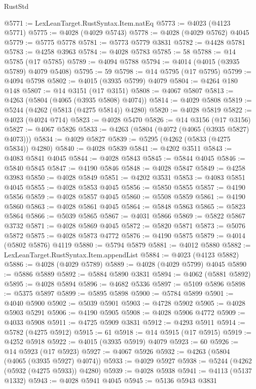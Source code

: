 \begin{lexlean}{RustStd}
\begin{coremodule}
@5771 := LexLeanTarget.RustSyntax.Item.natEq
@5773 := @4023 (@4123 @5771)
@5775 := @4028 (@4029 @5743)
@5778 := @4028 (@4029 @5762) @4045
@5779 := @5775 @5778
@5781 := @5773 @5779 @3831
@5782 := @4428 @5781
@5783 := @4258 @3963
@5784 := @4028 @5783
@5785 := 58
@5788 := @14 @5785 (@17 @5785)
@5789 := @4094 @5788
@5794 := @4014 (@4015 (@3935 @5789) @4079 @5408)
@5795 := 59
@5798 := @14 @5795 (@17 @5795)
@5799 := @4094 @5798
@5802 := @4015 (@3935 @5799) @4079
@5804 := @4264 @180 @148
@5807 := @14 @3151 (@17 @3151)
@5808 := @4067 @5807
@5813 := @4263 (@5804 (@4065 (@3935 @5808) @4074))
@5814 := @4029 @5808
@5819 := @5244 (@4262 (@5813 (@4275 @5814)) @4280)
@5820 := @4028 @5819
@5822 := @4023 (@4024 @714)
@5823 := @4028 @5470
@5826 := @14 @3156 (@17 @3156)
@5827 := @4067 @5826
@5833 := @4263 (@5804 (@4072 (@4065 (@3935 @5827) @4073)))
@5834 := @4029 @5827
@5839 := @5295 (@4262 (@5833 (@4275 @5834)) @4280)
@5840 := @4028 @5839
@5841 := @4202 @3511
@5843 := @4083 @5841 @4045
@5844 := @4028 @5843
@5845 := @5844 @4045
@5846 := @5840 @5845
@5847 := @4190 @5846
@5848 := @4028 @5847
@5849 := @4258 @3983
@5850 := @4028 @5849
@5851 := @4202 @3531
@5853 := @4083 @5851 @4045
@5855 := @4028 @5853 @4045
@5856 := @5850 @5855
@5857 := @4190 @5856
@5859 := @4028 @5857 @4045
@5860 := @5508 @5859
@5861 := @4190 @5860
@5863 := @4028 @5861 @4045
@5864 := @5848 @5863
@5865 := @5823 @5864
@5866 := @5039 @5865
@5867 := @4031 @5866
@5869 := @5822 @5867 @3732
@5871 := @4028 @5869 @4045
@5872 := @5820 @5871
@5873 := @5076 @5872
@5875 := @4028 @5873 @4772
@5876 := @4190 @5875
@5879 := @4014 (@5802 @5876) @4119
@5880 := @5794 @5879
@5881 := @4012 @5880
@5882 := LexLeanTarget.RustSyntax.Item.appendList
@5884 := @4023 (@4123 @5882)
@5886 := @4028 (@4029 @5789)
@5889 := @4028 (@4029 @5799) @4045
@5890 := @5886 @5889
@5892 := @5884 @5890 @3831
@5894 := @4062 (@5881 @5892)
@5895 := @4028 @5894
@5896 := @4682 @5336
@5897 := @5109 @5896
@5898 := @5375 @5897
@5899 := @5895 @5898
@5900 := @5784 @5899
@5901 := @4040 @5900
@5902 := @5039 @5901
@5903 := @4728 @5902
@5905 := @4028 @5903 @5291
@5906 := @4190 @5905
@5908 := @4028 @5906 @4772
@5909 := @4033 @5908
@5911 := @4725 @5909 @3831
@5912 := @4293 @5911
@5914 := @5782 (@4275 @5912)
@5915 := 61
@5918 := @14 @5915 (@17 @5915)
@5919 := @4252 @5918
@5922 := @4015 (@3935 @5919) @4079
@5923 := 60
@5926 := @14 @5923 (@17 @5923)
@5927 := @4067 @5926
@5932 := @4263 (@5804 (@4065 (@3935 @5927) @4074))
@5933 := @4029 @5927
@5938 := @5244 (@4262 (@5932 (@4275 @5933)) @4280)
@5939 := @4028 @5938
@5941 := @4113 (@5137 @1332)
@5943 := @4028 @5941 @4045
@5945 := @5136 @5943 @3831

\end{coremodule}
\end{lexlean}
